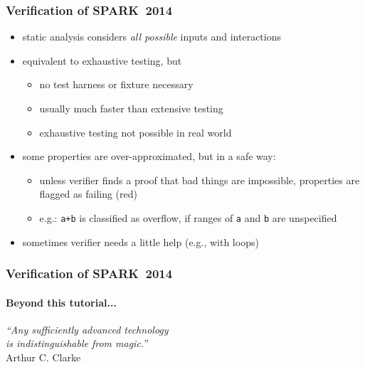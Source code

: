 \begin{frame}
  \frametitle{Verification of SPARK~2014}
  \begin{itemize}
  \item static analysis considers \emph{all possible} inputs and interactions
  \item equivalent to exhaustive testing, but 
    \begin{itemize}
    \item no test harness or fixture necessary
    \item usually much faster than extensive testing
    \item exhaustive testing not possible in real world
    \end{itemize}
  \item some properties are over-approximated, but in a safe way:
    \begin{itemize}
    \item unless verifier finds a proof that bad things are impossible, properties are flagged as failing (red)
    \item e.g.: \texttt{a+b} is classified as overflow, if ranges of \texttt{a} and \texttt{b} are unspecified
    \end{itemize}
  \item sometimes verifier needs a little help (e.g., with loops)
  \end{itemize}
\end{frame}
\addtocounter{clock}{2}

\begin{frame}[fragile]
  \frametitle{Verification of SPARK~2014}
  \framesubtitle{Beyond this tutorial...}
\textit{``Any sufficiently advanced technology\\is indistinguishable from magic.''}\vspace{.4em}\\{\scriptsize Arthur C. Clarke}

\end{frame}
\addtocounter{clock}{1}


